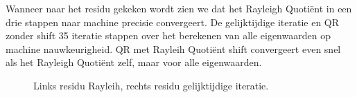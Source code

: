 Wanneer naar het residu gekeken wordt zien we dat het Rayleigh Quoti\"ent in een drie stappen naar machine precisie convergeert. De gelijktijdige iteratie en QR zonder shift 35 iteratie stappen over het berekenen van alle eigenwaarden op machine nauwkeurigheid. QR met Rayleih Quoti\"ent shift convergeert even snel als het Rayleigh Quoti\"ent zelf, maar voor alle eigenwaarden.\\[12 pt]
\begin{figure}[!tbp]
  \centering
  \hfill
  \caption{Links residu Rayleih, rechts residu gelijktijdige iteratie.}
\end{figure}

